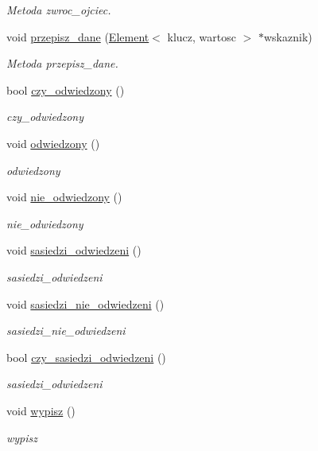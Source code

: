 \begin{DoxyCompactItemize}
\begin{DoxyCompactList}\small\item\em Metoda zwroc\+\_\+ojciec. \end{DoxyCompactList}\item 
void \hyperlink{class_element_aacd6653f0fa6475a8b2e122dddf80627}{przepisz\+\_\+dane} (\hyperlink{class_element}{Element}$<$ klucz, wartosc $>$ $\ast$wskaznik)
\begin{DoxyCompactList}\small\item\em Metoda przepisz\+\_\+dane. \end{DoxyCompactList}\item 
bool \hyperlink{class_element_a92f1c6c72a7b768cd2d295eb6b6c3d0e}{czy\+\_\+odwiedzony} ()
\begin{DoxyCompactList}\small\item\em czy\+\_\+odwiedzony \end{DoxyCompactList}\item 
void \hyperlink{class_element_af45d4a7953e01a1d9916eed0ab17f6bb}{odwiedzony} ()
\begin{DoxyCompactList}\small\item\em odwiedzony \end{DoxyCompactList}\item 
void \hyperlink{class_element_a1091b5a9763464470901903c27fa3af4}{nie\+\_\+odwiedzony} ()
\begin{DoxyCompactList}\small\item\em nie\+\_\+odwiedzony \end{DoxyCompactList}\item 
void \hyperlink{class_element_aea8ebe54afa2525740e1b065f9fd3a13}{sasiedzi\+\_\+odwiedzeni} ()
\begin{DoxyCompactList}\small\item\em sasiedzi\+\_\+odwiedzeni \end{DoxyCompactList}\item 
void \hyperlink{class_element_a04d9f1bebfc82dad1ca3e32e1f84fd5d}{sasiedzi\+\_\+nie\+\_\+odwiedzeni} ()
\begin{DoxyCompactList}\small\item\em sasiedzi\+\_\+nie\+\_\+odwiedzeni \end{DoxyCompactList}\item 
bool \hyperlink{class_element_a07619a03996d2a7261d78dea30319d7a}{czy\+\_\+sasiedzi\+\_\+odwiedzeni} ()
\begin{DoxyCompactList}\small\item\em sasiedzi\+\_\+odwiedzeni \end{DoxyCompactList}\item 
void \hyperlink{class_element_afd6003b54275449e8b67d34a842a87fc}{wypisz} ()
\begin{DoxyCompactList}\small\item\em wypisz \end{DoxyCompactList}\end{DoxyCompactItemize}


